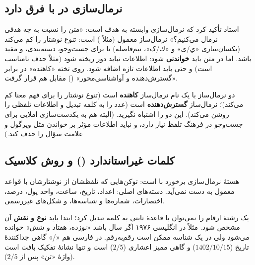 \subsection{نرمال‌سازی در  با  فرق دارد}
استاد تأکید کرد که نرمال‌سازی وابسته به هدف است: «متن را نسبت به چه هدفی نرمال می‌کنیم؟» نرمال‌ساز معمول  (مثلاً )  است: تنوع نوشتار را کم می‌کند (یکسان‌سازی «ي/ی» و «ك/ک»، نیم‌فاصله) تا برای جست‌وجو، دسته‌بندی،  و  مفید باشد. اما در  متن باید \textbf{خواندنی} شود: اطلاعات نباید دور ریخته شود (مثلاً حذف  نامناسب است) و حتی باید اطلاعات تازه اضافه شود. روی تخته «کاهنده» در برابر «گسترش‌دهنده و آواشناسی‌محور» () مقابل هم قرار گرفت.

\begin{warningbox}{دو نرمال‌ساز با یک نام}
نرمال‌ساز  \textbf{کاهنده} است (تنوع نوشتار را برای فهم معنا کم می‌کند)؛ نرمال‌ساز  \textbf{گسترش‌دهنده} است (عدد را به کلمه تبدیل و اطلاعات تلفظی را روشن می‌کند). این دو را اشتباه نگیرید. (البته  هم به یکدست‌سازی املایی برای جست‌وجو در فرهنگ تلفظ نیاز دارد، و نباید اطلاعات مؤثر بر خواندن مثل ویرگول و علامت سؤال را حذف کند.)
\end{warningbox}



\subsection{کلمات غیراستاندارد () و روش کلاسیک}
هستهٔ نرمال‌سازی  برخورد با  است: توکن‌هایی که تلفظشان از نوشتارشان با قواعد معمول به دست نمی‌آید. دسته‌های اصلی: اعداد، تاریخ، ساعت، واحد پول، درصد، اختصارات، شماره‌ها و شناسه‌ها، و شکل‌های غیررسمی.

یک رشتهٔ ارقام را نمی‌توان با قاعدهٔ ثابتی به کلمه تبدیل کرد؛ ابتدا باید \textbf{نوع و نقش} آن مشخص شود. مثلاً در انگلیسی ۱۹۷۶ اگر سال باشد «نوزده، هفتاد و شش» خوانده می‌شود ولی در یک شناسه ممکن است رقم‌به‌رقم. در فارسی هم «/» گاهی جداکنندهٔ تاریخ ($1402/10/15$) و گاهی ممیز اعشاری ($2/5$) است و تنها نشانهٔ تفکیک بافت است (واژهٔ «تن» پس از $2/5$).

